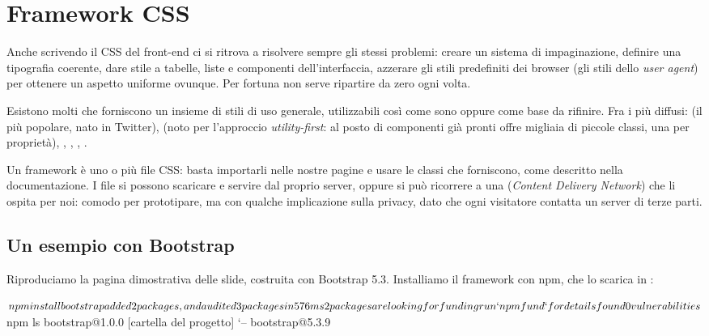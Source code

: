 \section{Framework CSS}

Anche scrivendo il CSS del front-end ci si ritrova a risolvere sempre gli stessi
problemi: creare un sistema di impaginazione, definire una tipografia coerente,
dare stile a tabelle, liste e componenti dell'interfaccia, azzerare gli stili
predefiniti dei browser (gli stili dello \textit{user agent}) per ottenere un
aspetto uniforme ovunque. Per fortuna non serve ripartire da zero ogni volta.

Esistono molti  che forniscono un insieme di stili di uso
generale, utilizzabili così come sono oppure come base da rifinire. Fra i più
diffusi:  (il più popolare, nato in Twitter),
 (noto per l'approccio \textit{utility-first}: al posto di
componenti già pronti offre migliaia di piccole classi, una per proprietà),
, , , .


Un framework è uno o più file CSS: basta importarli nelle nostre pagine e usare
le classi che forniscono, come descritto nella documentazione. I file si possono
scaricare e servire dal proprio server, oppure si può ricorrere a una
 (\textit{Content Delivery Network}) che li ospita per noi: comodo per
prototipare, ma con qualche implicazione sulla privacy, dato che ogni visitatore
contatta un server di terze parti.

\subsection{Un esempio con Bootstrap}

Riproduciamo la pagina dimostrativa delle slide, costruita con Bootstrap 5.3.
Installiamo il framework con npm, che lo scarica in :

\begin{console}[Terminale]
$ npm install bootstrap

added 2 packages, and audited 3 packages in 576ms

2 packages are looking for funding
  run `npm fund` for details

found 0 vulnerabilities
$ npm ls
bootstrap@1.0.0 [cartella del progetto]
`-- bootstrap@5.3.9
\end{console}

